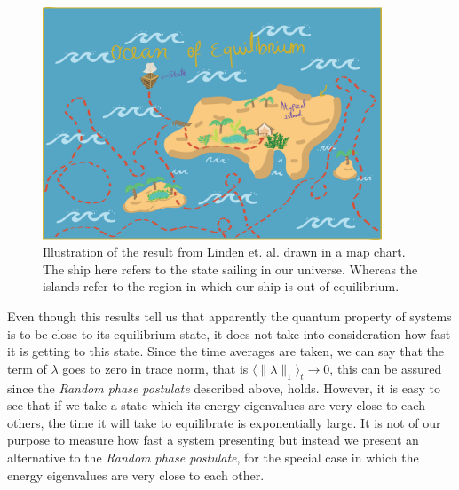 \begin{figure}[h!]
\centering
\includegraphics[width=0.9\textwidth]{Figures/ocean-of-equilibrium.png}
\caption{Illustration of the result from Linden et. al. drawn in a map chart. The ship here refers to the state sailing in our universe. Whereas the islands refer to the region in which our ship is out of equilibrium.}
\label{Island_of_equilibrium}
\end{figure}
\indent Even though this results tell us that apparently the quantum property of systems is to be close to its equilibrium state, it does not take into consideration how fast it is getting to this state. Since the time averages are taken, we can say that the term of $\lambda$ goes to zero in trace norm, that is $\langle\| \lambda\|_1\rangle_t \to 0$, this can be assured since the \textit{Random phase postulate} described above, holds. However, it is easy to see that if we take a state which  its energy eigenvalues are very close to each others, the time it will take to equilibrate is exponentially large. It is not of our purpose to measure how fast a system presenting but instead we present an alternative to the \textit{Random phase postulate}, for the special case in which the energy eigenvalues are very close to each other.\\

